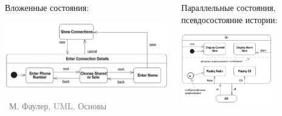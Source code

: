 \documentclass[xetex,mathserif,serif]{beamer}
\newcommand{\attribution}[1] {
	\vspace{-5mm}\begin{flushright}\begin{scriptsize}\textcolor{gray}{\textcopyright\, #1}\end{scriptsize}\end{flushright}
}
\begin{document}
\begin{frame}
		\begin{columns}
			\begin{column}{0.5\textwidth}
				Вложенные состояния:
				\begin{center}
					\includegraphics[width=\textwidth]{stateTransitionNestedStates.png}
					\attribution{М. Фаулер, UML. Основы}
				\end{center}
			\end{column}
			\begin{column}{0.5\textwidth}
				Параллельные состояния, псевдосостояние истории:
				\begin{center}
					\includegraphics[width=0.7\textwidth]{stateTransitionParallelStates.png}
				\end{center}
			\end{column}
		\end{columns}
	\end{frame}
\end{document}
